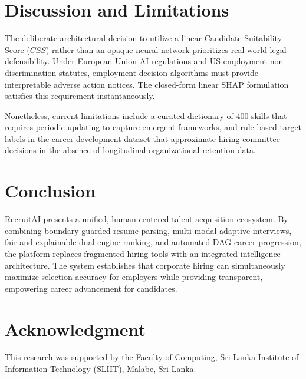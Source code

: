 \documentclass[conference]{IEEEtran}
\begin{document}
\section{Discussion and Limitations}
The deliberate architectural decision to utilize a linear Candidate Suitability Score ($CSS$) rather than an opaque neural network prioritizes real-world legal defensibility. Under European Union AI regulations and US employment non-discrimination statutes, employment decision algorithms must provide interpretable adverse action notices. The closed-form linear SHAP formulation satisfies this requirement instantaneously.

Nonetheless, current limitations include a curated dictionary of 400 skills that requires periodic updating to capture emergent frameworks, and rule-based target labels in the career development dataset that approximate hiring committee decisions in the absence of longitudinal organizational retention data.

\section{Conclusion}
RecruitAI presents a unified, human-centered talent acquisition ecosystem. By combining boundary-guarded resume parsing, multi-modal adaptive interviews, fair and explainable dual-engine ranking, and automated DAG career progression, the platform replaces fragmented hiring tools with an integrated intelligence architecture. The system establishes that corporate hiring can simultaneously maximize selection accuracy for employers while providing transparent, empowering career advancement for candidates.

\section*{Acknowledgment}
This research was supported by the Faculty of Computing, Sri Lanka Institute of Information Technology (SLIIT), Malabe, Sri Lanka.
\end{document}
